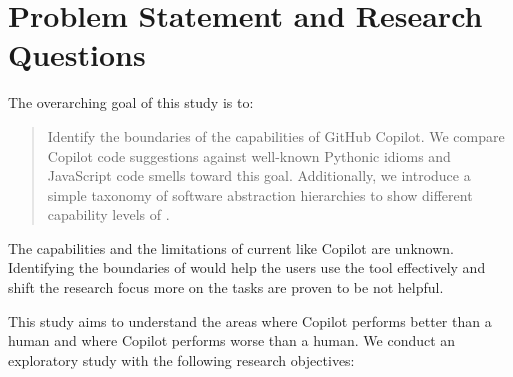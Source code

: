 \section{Problem Statement and Research Questions}
The overarching goal of this study is to:
\begin{quote}
    Identify the boundaries of the capabilities of GitHub Copilot. We compare Copilot code suggestions against well-known Pythonic idioms and JavaScript code smells toward this goal. Additionally, we introduce a simple taxonomy of software abstraction hierarchies to show different capability levels of \cct{}. 
\end{quote}

The capabilities and the limitations of current \cct{} like Copilot are unknown. Identifying the boundaries of \cct{} would help the users use the tool effectively and shift the research focus more on the tasks \cct{} are proven to be not helpful. 

This study aims to understand the areas where Copilot performs better than a human and where Copilot performs worse than a human. 
We conduct an exploratory study with the following research objectives:

